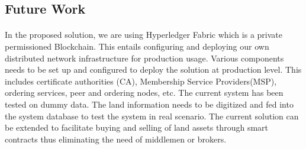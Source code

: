 \documentclass{article}
\begin{document}
        \subsection{Future Work}
            \paragraph{}
            In the proposed solution, we are using Hyperledger Fabric \cite{fabric} which is a private permissioned Blockchain. This entails configuring and deploying our own distributed network infrastructure for production usage. Various components needs to be set up and configured to deploy the solution at production level. This includes certificate authorities (CA), Membership Service Providers(MSP), ordering services, peer and ordering nodes, etc. The current system has been tested on dummy data. The land information needs to be digitized and fed into the system database to test the system in real scenario. The current solution can be extended to facilitate buying and selling of land assets through smart contracts thus eliminating the need of middlemen or brokers.  
        

    \clearpage
    
    
\end{document}
